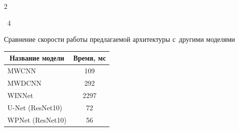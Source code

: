 \begin{multicols}{2}


\begin{center}


\parbox{58mm}{{{\tablename~4}\ \ \small{Сравнение скорости работы предлагаемой архитектуры с~другими моделями


}}





}





\label{tab:time_comparison}


\vspace*{2ex}





{\small 


\tabcolsep=12pt


\begin{tabular}{ |l|c|}


\hline


\multicolumn{1}{|c|}{Название модели} & Время, мс \\


\hline


{MWCNN~\cite{MWCNN}} & 109\\


{MWDCNN~\cite{MDIWT}} & 292\\


{WINNet~\cite{WINNet}} & 2297\hphantom{9}\\ 


U-Net (ResNet10) & 72\\


WPNet (ResNet10)& 56\\


\hline


\end{tabular}


}


\end{center}







\vspace*{6pt}












\end{multicols}
